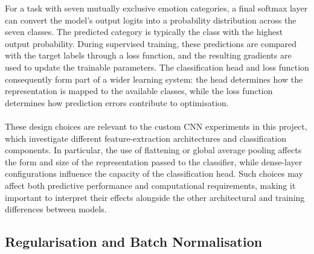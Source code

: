 \documentclass[12pt, a4paper]{report}
\let\oldsubsection\subsection
\renewcommand{\subsection}{%
    \Needspace{6\baselineskip}%
    \oldsubsection
}
\begin{document}
				For a task with seven mutually exclusive emotion categories, a final softmax layer can convert the model's output logits into a probability distribution across the seven classes. The predicted category is typically the class with the highest output probability. During supervised training, these predictions are compared with the target labels through a loss function, and the resulting gradients are used to update the trainable parameters. The classification head and loss function consequently form part of a wider learning system: the head determines how the representation is mapped to the available classes, while the loss function determines how prediction errors contribute to optimisation.\\\\
				 These design choices are relevant to the custom CNN experiments in this project, which investigate different feature-extraction architectures and classification components. In particular, the use of flattening or global average pooling affects the form and size of the representation passed to the classifier, while dense-layer configurations influence the capacity of the classification head. Such choices may affect both predictive performance and computational requirements, making it important to interpret their effects alongside the other architectural and training differences between models.
				
			\subsection{Regularisation and Batch Normalisation}
				
\end{document}
